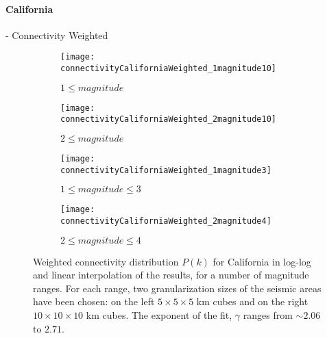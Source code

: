 \paragraph{California} - Connectivity Weighted
\begin{figure}[!h]
\begin{subfigure}{.99\textwidth}
  \centering
  \texttt{[image: connectivityCaliforniaWeighted\_1magnitude10]}
  \caption{$1 \leq magnitude$}
  \label{fig:conWeiCa1mag10}
\end{subfigure}%

\begin{subfigure}{.99\textwidth}
  \centering
  \texttt{[image: connectivityCaliforniaWeighted\_2magnitude10]}
  \caption{$2\leq magnitude$}
  \label{fig:conWeiCa2mag10}
\end{subfigure}%

\begin{subfigure}{.99\textwidth}
  \centering
  \texttt{[image: connectivityCaliforniaWeighted\_1magnitude3]}
  \caption{$1 \leq magnitude \leq 3$}
  \label{fig:conWeiCa1mag3}
\end{subfigure}%

\begin{subfigure}{.99\textwidth}
  \centering
  \texttt{[image: connectivityCaliforniaWeighted\_2magnitude4]}
  \caption{$2 \leq magnitude \leq 4$}
  \label{fig:conWeiCa2mag4}
\end{subfigure}%


\caption{Weighted connectivity distribution $P(k)$ for California in log-log and linear interpolation of the results, for a number of magnitude ranges. For each range, two granularization sizes of the seismic areas have been chosen: on the left $5 \times 5 \times5 $ km cubes and on the right $10 \times 10 \times 10$ km cubes. The exponent of the fit, $\gamma$ ranges from $\sim 2.06$ to $2.71$.}
\label{fig:connectivityCaWeighted}
\end{figure}


\clearpage
